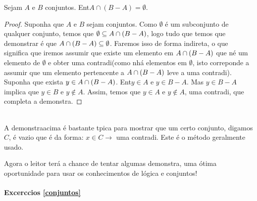 \begin{teob}
Sejam $A$ e $B$ conjuntos. Ent\ao $A\cap(B-A)=\emptyset.$
\end{teob}
\begin{proof}
Suponha que $A$ e $B$ sejam conjuntos. Como $\emptyset$ \'e um subconjunto de qualquer conjunto, temos que $\emptyset\subseteq A\cap(B-A)$, logo tudo que temos que demonstrar \'e que $A\cap(B-A)\subseteq\emptyset$. Faremos isso de forma indireta, o que significa que iremos assumir que existe um elemento  em $A\cap(B-A)$ que n\ao \'e um elemento de $\emptyset$ e obter uma contradi\cao (como n\ao h\'a elementos em $\emptyset$, isto correponde a assumir que um elemento pertencente a $A\cap(B-A)$ leve a uma contradi\caoi). Suponha que exista $y\in A\cap(B-A)$. Ent\ao $y\in A$ e $y\in B-A$. Mas $y\in B-A$ implica que $y\in B$ e $y\notin A$. Assim, temos que $y\in A$ e $y\notin A$, uma contradi\caoi, que completa a demonstra\caoi. 
\end{proof}
\\

A demonstra\cao acima \'e bastante t\ih pica para mostrar que um certo conjunto, digamos $C$, \'e vazio que \'e da forma: $x\in C\to$ uma contradi\caoi. Este \'e o m\'etodo geralmente usado. 

Agora o leitor ter\'a a chance de tentar algumas demonstra\cois, uma \'otima oportunidade para usar os conhecimentos de l\'ogica e conjuntos!

\paragraph{Excerc\ih cios \ref{conjuntos}}

